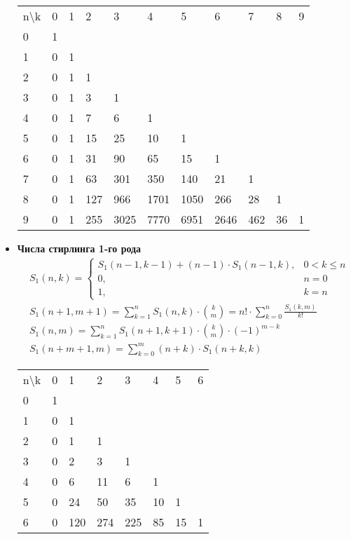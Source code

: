\documentclass[10pt]{article}
\begin{document}
\begin{itemize}
\begin{longtable}[c]{lllllllllll}
n\textbackslash{}k & 0 & 1 & 2 & 3 & 4 & 5 & 6 & 7 & 8 & 9
\\
0 & 1 & & & & & & & & &
\\
1 & 0 & 1 & & & & & & & &
\\
2 & 0 & 1 & 1 & & & & & & &
\\
3 & 0 & 1 & 3 & 1 & & & & & &
\\
4 & 0 & 1 & 7 & 6 & 1 & & & & &
\\
5 & 0 & 1 & 15 & 25 & 10 & 1 & & & &
\\
6 & 0 & 1 & 31 & 90 & 65 & 15 & 1 & & &
\\
7 & 0 & 1 & 63 & 301 & 350 & 140 & 21 & 1 & &
\\
8 & 0 & 1 & 127 & 966 & 1701 & 1050 & 266 & 28 & 1 &
\\
9 & 0 & 1 & 255 & 3025 & 7770 & 6951 & 2646 & 462 & 36 & 1
\\

\end{longtable}
\item \textbf{Числа стирлинга 1-го рода}
\begin{equation}
  \begin{split}
    &S_1(n, k) = 
    \left\{
    \begin{array}{cc}
    S_1(n-1, k-1) + (n - 1) \cdot S_1(n-1, k), & 0 < k \le n\\
    0, & n = 0\\
    1, & k = n
    \end{array}
    \right.\\
    &S_1(n + 1, m + 1) = \sum\limits_{k = 1}^n S_1(n, k) \cdot \binom{k}{m} = n! \cdot \sum\limits_{k=0}^n\frac{S_1(k, m)}{k!}\\
    &S_1(n, m) = \sum\limits_{k=1}^n S_1(n + 1, k + 1) \cdot \binom{k}{m} \cdot (-1)^{m - k}\\
    &S_1(n + m + 1, m) = \sum\limits_{k=0}^m (n + k) \cdot S_1(n + k, k)
  \end{split}
\end{equation}
\begin{longtable}[c]{llllllll}

n\textbackslash{}k & 0 & 1 & 2 & 3 & 4 & 5 & 6
\\

0 & 1 & & & & & &
\\
1 & 0 & 1 & & & & &
\\
2 & 0 & 1 & 1 & & & &
\\
3 & 0 & 2 & 3 & 1 & & &
\\
4 & 0 & 6 & 11 & 6 & 1 & &
\\
5 & 0 & 24 & 50 & 35 & 10 & 1 &
\\
6 & 0 & 120 & 274 & 225 & 85 & 15 & 1
\\


\end{longtable}
\end{itemize}
\end{document}
